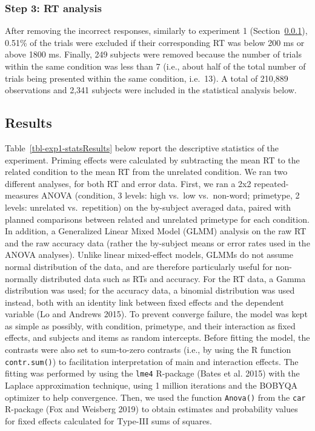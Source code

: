 \documentclass[
]{interact}
\begin{document}
\subsubsection{Step 3: RT analysis}\label{sec-exp1-analysis-RT}

After removing the incorrect responses, similarly to experiment 1
(Section~\ref{sec-exp1-analysis-RT}), 0.51\% of the trials were excluded
if their corresponding RT was below 200 ms or above 1800 ms. Finally,
249 subjects were removed because the number of trials within the same
condition was less than 7 (i.e., about half of the total number of
trials being presented within the same condition, i.e.~13). A total of
210,889 observations and 2,341 subjects were included in the statistical
analysis below.

\subsection{Results}\label{sec-exp1-results}

Table~\ref{tbl-exp1-statsResults} below report the descriptive
statistics of the experiment. Priming effects were calculated by
subtracting the mean RT to the related condition to the mean RT from the
unrelated condition. We ran two different analyses, for both RT and
error data. First, we ran a 2x2 repeated-measures ANOVA (condition, 3
levels: high vs.~low vs.~non-word; primetype, 2 levels: unrelated
vs.~repetition) on the by-subject averaged data, paired with planned
comparisons between related and unrelated primetype for each condition.
In addition, a Generalized Linear Mixed Model (GLMM) analysis on the raw
RT and the raw accuracy data (rather the by-subject means or error rates
used in the ANOVA analyses). Unlike linear mixed-effect models, GLMMs do
not assume normal distribution of the data, and are therefore
particularly useful for non-normally distributed data such as RTs and
accuracy. For the RT data, a Gamma distribution was used; for the
accuracy data, a binomial distribution was used instead, both with an
identity link between fixed effects and the dependent variable (Lo and
Andrews 2015). To prevent converge failure, the model was kept as simple
as possibly, with condition, primetype, and their interaction as fixed
effects, and subjects and items as random intercepts. Before fitting the
model, the contrasts were also set to sum-to-zero contrasts (i.e., by
using the R function \texttt{contr.sum()}) to facilitation
interpretation of main and interaction effects. The fitting was
performed by using the \texttt{lme4} R-package (Bates et al. 2015) with
the Laplace approximation technique, using 1 million iterations and the
BOBYQA optimizer to help convergence. Then, we used the function
\texttt{Anova()} from the \texttt{car} R-package (Fox and Weisberg 2019)
to obtain estimates and probability values for fixed effects calculated
for Type-III sums of squares.
\end{document}
